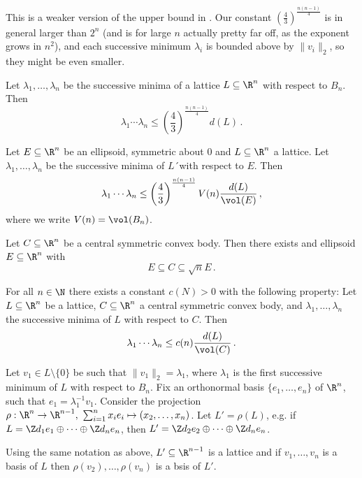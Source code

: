 \begin{rem*}
	This is a weaker version of the upper bound in .
	Our constant \( \left(\frac{4}{3}\right)^{\frac{n(n-1)}{4}} \) is in general larger than \( 2^n \) (and is for large \( n \) actually pretty far off, as the exponent grows in \( n^2 \)), and each successive minimum \( \lambda_i \) is bounded above by \( \| v_i \|_2 \), so they might be even smaller.
\end{rem*}

\begin{cor}
	Let \( \lambda_1, \dotsc, \lambda_n \) be the successive minima of a lattice \( L \subseteq \R^n \) with respect to \( B_n \).
	Then
	\[ \lambda_1 \dotsm \lambda_n \leq \left( \frac{4}{3} \right)^{\frac{n(n-1)}{4}} d(L) \,. \]
\end{cor}

\begin{cor}
	Let \( E \subseteq \R^n \) be an ellipsoid, symmetric about 0 and \( L \subseteq \R^n \) a lattice.
	Let \( \lambda_1, \dotsc, \lambda_n \) be the successive minima of \( L \)´with respect to \( E \).
	Then
	\[ \lambda_1 \dotsm \lambda_n \leq \left( \frac{4}{3} \right)^\frac{n(n-1)}{4} V(n) \frac{d(L)}{\vol(E)} \,, \]
	where we write \( V(n) = \vol(B_n) \).
\end{cor}

\begin{thm*} 
	Let \( C \subseteq \R^n \) be a central symmetric convex body.
	Then there exists and ellipsoid \( E \subseteq \R^n \) with
	\[ E \subseteq C \subseteq \sqrt{n} E \,. \]
\end{thm*}

\begin{cor}
	For all \( n \in \N \) there exists a constant \( c(N) > 0 \) with the following property:
	Let \( L \subseteq \R^n \) be a lattice, \( C \subseteq \R^n \) a central symmetric convex body, and \( \lambda_1, \dotsc, \lambda_n \) the successive minima of \( L \) with respect to \( C \).
	Then
	\[ \lambda_1 \dotsm \lambda_n \leq c(n) \frac{d(L)}{\vol(C)}\, . \]
\end{cor}

Let \( v_1 \in L \setminus \{0\} \) be such that \( \|v_1\|_2 = \lambda_1 \), where \( \lambda_1 \) is the first successive minimum of \( L \) with respect to \( B_n \).
Fix an orthonormal basis \( \{e_1, \dotsc, e_n\} \) of \( \R^n \), such that \( e_1 = \lambda_1^{-1} v_1 \).
Consider the projection \( \rho: \R^n \to \R^{n-1},\ \sum_{i=1}^{n} x_i e_i \mapsto (x_2, \dotsc, x_n) \).
Let \( L' = \rho(L) \), e.g. if \( L = \Z d_1 e_1 \oplus \dots \oplus \Z d_n e_n \), then \( L' = \Z d_2 e_2 \oplus \dots \oplus \Z d_n e_n \).

\begin{lem}
	Using the same notation as above, \( L' \subseteq \R^{n-1} \) is a lattice and if \( v_1, \dotsc, v_n \) is a basis of \( L \) then \( \rho(v_2), \dotsc, \rho(v_n) \) is a bsis of \( L' \).
\end{lem}